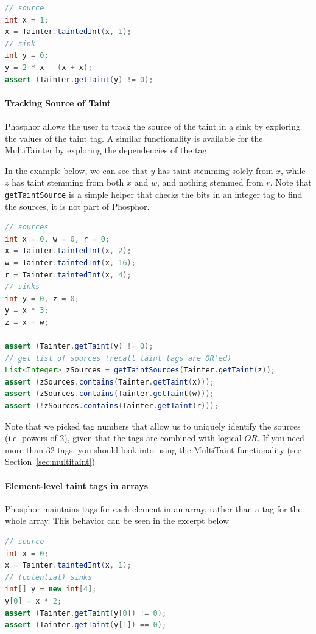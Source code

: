 \documentclass[a4paper]{article}
\begin{document}
\begin{lstlisting}[language=java]
// source
int x = 1;
x = Tainter.taintedInt(x, 1);
// sink
int y = 0;
y = 2 * x - (x + x);
assert (Tainter.getTaint(y) != 0);
\end{lstlisting}

\paragraph{Tracking Source of Taint}
Phosphor allows the user to track the source of the taint in a sink by exploring the values
of the taint tag. A similar functionality is available for the MultiTainter by exploring
the dependencies of the tag.

In the example below, we can see that $y$ has taint stemming solely from $x$, while $z$ has
taint stemming from both $x$ and $w$, and nothing stemmed from $r$. Note that
\verb|getTaintSource| is a simple helper that checks the bits in an integer tag to find the sources,
it is not part of Phosphor.

\begin{lstlisting}[language=java]
// sources
int x = 0, w = 0, r = 0;
x = Tainter.taintedInt(x, 2);
w = Tainter.taintedInt(x, 16);
r = Tainter.taintedInt(x, 4);
// sinks
int y = 0, z = 0;
y = x * 3;
z = x + w;

assert (Tainter.getTaint(y) != 0);
// get list of sources (recall taint tags are OR'ed)
List<Integer> zSources = getTaintSources(Tainter.getTaint(z));
assert (zSources.contains(Tainter.getTaint(x)));
assert (zSources.contains(Tainter.getTaint(w)));
assert (!zSources.contains(Tainter.getTaint(r)));
\end{lstlisting}

Note that we picked tag numbers that allow us to uniquely identify the sources (i.e. powers of 2),
given that the tags are combined with logical $OR$. If you need more than 32 tags, you should
look into using the MultiTaint functionality (see Section~\ref{sec:multitaint})


\paragraph{Element-level taint tags in arrays}
Phosphor maintains tags for each element in an array, rather than a tag for the
whole array\cite{bell2014phosphor}. This behavior can be seen in the excerpt below


\begin{lstlisting}[language=java]
// source
int x = 0;
x = Tainter.taintedInt(x, 1);
// (potential) sinks
int[] y = new int[4];
y[0] = x * 2;
assert (Tainter.getTaint(y[0]) != 0);
assert (Tainter.getTaint(y[1]) == 0);
\end{lstlisting}
\end{document}
